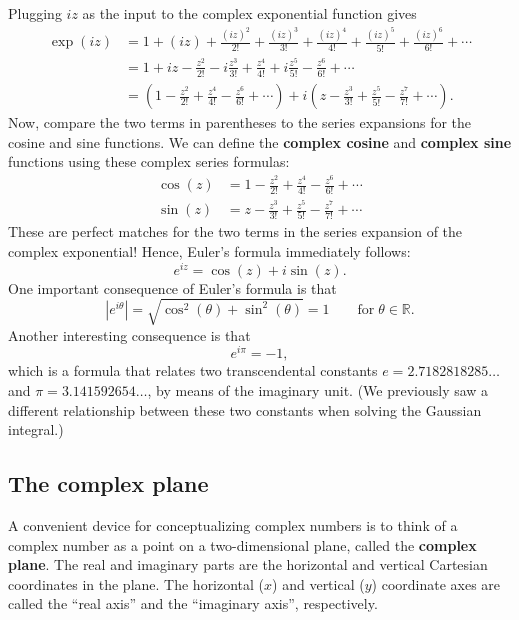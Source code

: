 \documentclass[10pt,a4paper]{article}
\begin{document}
Plugging $iz$ as the input to the complex exponential function gives
\begin{align}
  \exp(iz) &= 1 + (iz) + \frac{(iz)^2}{2!} + \frac{(iz)^3}{3!} + \frac{(iz)^4}{4!} + \frac{(iz)^5}{5!} + \frac{(iz)^6}{6!} + \cdots \\&= 1 + iz - \frac{z^2}{2!} - i \frac{z^3}{3!} + \frac{z^4}{4!} + i \frac{z^5}{5!} - \frac{z^6}{6!} + \cdots \\& = \left(1 - \frac{z^2}{2!} + \frac{z^4}{4!} - \frac{z^6}{6!} + \cdots\right) + i\left(z  - \frac{z^3}{3!}  + \frac{z^5}{5!}  - \frac{z^7}{7!} + \cdots\right).
\end{align}
Now, compare the two terms in parentheses to the series expansions for
the cosine and sine functions. We can define the \textbf{complex
  cosine} and \textbf{complex sine} functions using these complex
series formulas:
\begin{equation}
\begin{aligned}\cos(z) &= 1 - \frac{z^2}{2!} + \frac{z^4}{4!} - \frac{z^6}{6!} + \cdots \\ \sin(z) &= z - \frac{z^3}{3!} + \frac{z^5}{5!} - \frac{z^7}{7!} + \cdots\end{aligned}
\end{equation}
These are perfect matches for the two terms in the series expansion of
the complex exponential! Hence, Euler's formula immediately follows:
\begin{equation}
e^{iz} = \cos(z) + i \sin(z).
\end{equation}
One important consequence of Euler's formula is that
\begin{equation}
\left|e^{i\theta}\right| = \sqrt{\cos^2(\theta) + \sin^2(\theta)} = 1 \qquad \mathrm{for}\; \theta \in \mathbb{R}.
\end{equation}
Another interesting consequence is that
\begin{equation}
e^{i\pi} = -1,
\end{equation}
which is a formula that relates two transcendental constants $e =
2.7182818285\dots$ and $\pi = 3.141592654\dots$, by means of the
imaginary unit. (We previously saw a different relationship between
these two constants when solving the Gaussian integral.)


\subsection{The complex plane}\label{the-complex-plane}

A convenient device for conceptualizing complex numbers is to think of a
complex number as a point on a two-dimensional plane, called the
\textbf{complex plane}. The real and imaginary parts are the horizontal
and vertical Cartesian coordinates in the plane. The horizontal ($x$)
and vertical ($y$) coordinate axes are called the ``real axis'' and
the ``imaginary axis'', respectively.
\end{document}
